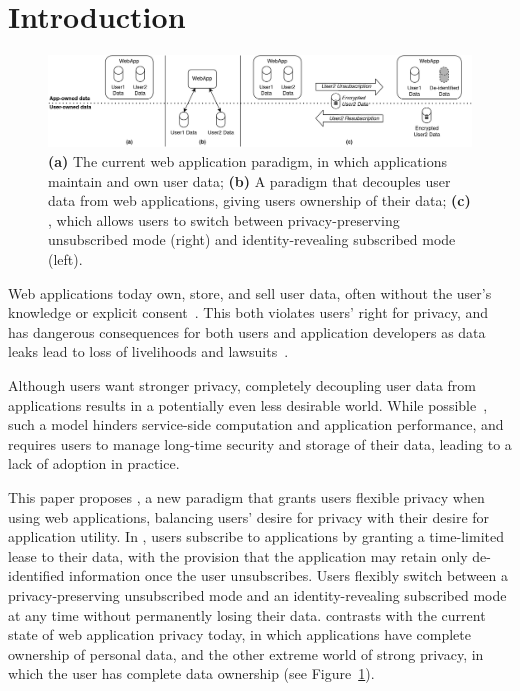 \section{Introduction}

\begin{figure}[ht!]
    \centering
    \includegraphics[width=\textwidth]{img/worlds}

    \caption{\textbf{(a)} The current web application paradigm, in which applications maintain and
    own user data; \textbf{(b)} A paradigm that decouples user data from web applications, giving users ownership of their data;
    \textbf{(c)} \sys, which allows users to switch between privacy-preserving unsubscribed mode (right) and identity-revealing subscribed mode (left).}
    \label{fig:world}
\end{figure}

Web applications today own, store, and sell user data, often without the user's knowledge or
explicit consent~\cite{nytimes:fb, npr:data}. This both violates users' right for privacy, and has
dangerous consequences for both users and application developers as data leaks lead to loss of
livelihoods and lawsuits~\cite{breach:amazon,breach:twitter, breach:fb, breach:marriott,
breach:quora}. 

Although users want stronger privacy, completely decoupling user data from applications results in a
potentially even less desirable world. While possible~\cite{solid, amber, w5, blockstack, bstore}, such a
model hinders service-side computation and application performance, and requires users to manage
long-time security and storage of their data, leading to a lack of adoption in practice.  

This paper proposes \sys, a new paradigm that grants users flexible privacy when using web
applications, balancing users' desire for privacy with their desire for application utility. In
\sys, users subscribe to applications by granting a time-limited lease to their data, with the
provision that the application may retain only de-identified information once the user unsubscribes.
Users flexibly switch between a privacy-preserving unsubscribed mode and an identity-revealing
subscribed mode at any time without permanently losing their data. \sys contrasts
with the current state of web application privacy today, in which applications have complete
ownership of personal data, and the other extreme world of strong privacy, in which the user has
complete data ownership (see Figure~\ref{fig:world}). 

